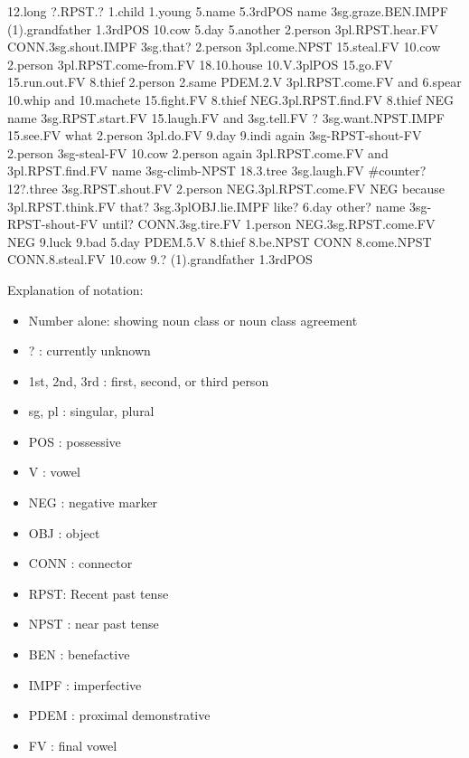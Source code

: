 {12.long} {?.RPST.?} {1.child} {1.young} {5.name} {5.3rdPOS} {name} {3sg.graze.BEN.IMPF} {(1).grandfather} {1.3rdPOS} {10.cow} {5.day} {5.another} {2.person} {3pl.RPST.hear.FV} {CONN.3sg.shout.IMPF} {3sg.that?} {2.person} {3pl.come.NPST} {15.steal.FV} {10.cow} {2.person} {3pl.RPST.come-from.FV} {18.10.house} {10.V.3plPOS} {15.go.FV} {15.run.out.FV} {8.thief} {2.person} {2.same} {PDEM.2.V} {3pl.RPST.come.FV} {and} {6.spear} {10.whip} {and} {10.machete} {15.fight.FV} {8.thief} {NEG.3pl.RPST.find.FV} {8.thief} {NEG} {name} {3sg.RPST.start.FV} {15.laugh.FV} {and} {3sg.tell.FV} {?} {3sg.want.NPST.IMPF} {15.see.FV} {what} {2.person} {3pl.do.FV} {9.day} {9.indi} {again} {3sg-RPST-shout-FV} {2.person} {3sg-steal-FV} {10.cow} {2.person} {again} {3pl.RPST.come.FV} {and} {3pl.RPST.find.FV} {name} {3sg-climb-NPST} {18.3.tree} {3sg.laugh.FV} {\#counter?} {12?.three} {3sg.RPST.shout.FV} {2.person} {NEG.3pl.RPST.come.FV} {NEG} {because} {3pl.RPST.think.FV} {that?} {3sg.3plOBJ.lie.IMPF} {like?} {6.day} {other?} {name} {3sg-RPST-shout-FV} {until?} {CONN.3sg.tire.FV} {1.person} {NEG.3sg.RPST.come.FV} {NEG} {9.luck} {9.bad} {5.day} {PDEM.5.V} {8.thief} {8.be.NPST} {CONN} {8.come.NPST} {CONN.8.steal.FV} {10.cow} {9.?} {(1).grandfather} {1.3rdPOS}
\glt
\glend

Explanation of notation:
\begin{itemize}
  \setlength{\itemsep}{-1pt}
\item Number alone: showing noun class or noun class agreement
\item ? : currently unknown
\item 1st, 2nd, 3rd : first, second, or third person
\item sg, pl : singular, plural
\item POS : possessive
\item V : vowel
\item NEG : negative marker
\item OBJ : object
\item CONN : connector
\item RPST: Recent past tense
\item NPST : near past tense
\item BEN : benefactive
\item IMPF : imperfective
\item PDEM : proximal demonstrative
\item FV : final vowel
\end{itemize}